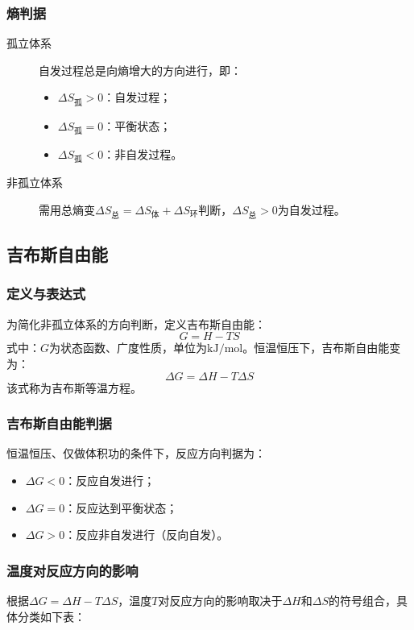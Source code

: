 \subsubsection{熵判据}
\begin{description}
    \item[孤立体系] 自发过程总是向熵增大的方向进行，即：
    \begin{itemize}
        \item $\Delta S_{\text{孤}}>0$：自发过程；
        \item $\Delta S_{\text{孤}}=0$：平衡状态；
        \item $\Delta S_{\text{孤}}<0$：非自发过程。
    \end{itemize}
    \item[非孤立体系] 需用总熵变$\Delta S_{\text{总}}=\Delta S_{\text{体}}+\Delta S_{\text{环}}$判断，$\Delta S_{\text{总}}>0$为自发过程。
\end{description}

\subsection{吉布斯自由能}
\subsubsection{定义与表达式}
为简化非孤立体系的方向判断，定义吉布斯自由能：
\[
G = H - TS
\]
式中：$G$为状态函数、广度性质，单位为$
\si{\kilo\joule\per\mole}$。恒温恒压下，吉布斯自由能变为：
\[
\Delta G = \Delta H - T\Delta S
\]
该式称为吉布斯等温方程。

\subsubsection{吉布斯自由能判据}
恒温恒压、仅做体积功的条件下，反应方向判据为：
\begin{itemize}
    \item $\Delta G<0$：反应自发进行；
    \item $\Delta G=0$：反应达到平衡状态；
    \item $\Delta G>0$：反应非自发进行（反向自发）。
\end{itemize}

\subsubsection{温度对反应方向的影响}
根据$\Delta G=\Delta H-T\Delta S$，温度$T$对反应方向的影响取决于$\Delta H$和$\Delta S$的符号组合，具体分类如下表：

